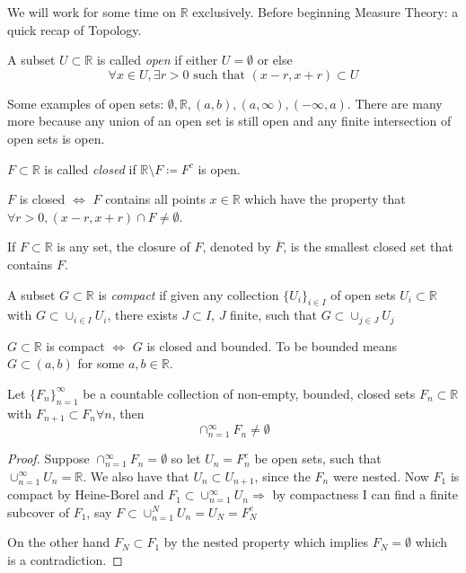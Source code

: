 We will work for some time on $\mathbb{R}$ exclusively.
Before beginning Measure Theory: a quick recap of Topology.

\begin{definition}
    A subset $U \subset \mathbb{R}$ is called \emph{open} if either $U = \emptyset$ or else
    \[
        \forall x \in U, \exists r > 0 \text{ such that } (x-r,x+r) \subset U
    \]
\end{definition}

Some examples of open sets: $\emptyset, \mathbb{R}, (a,b), (a,\infty), (-\infty, a)$.
There are many more because any union of an open set is still open and any finite intersection of open sets is open.

\begin{definition}
    $F \subset \mathbb{R}$ is called \emph{closed} if $\mathbb{R} \setminus F \coloneqq F^c $ is open.

    $F$ is closed $\iff$ $F$ contains all points $x \in \mathbb{R}$ which have the property that $\forall r > 0, (x-r, x+r) \cap F \neq \emptyset$.
\end{definition}

If $F \subset \mathbb{R}$ is any set, the closure of $F$, denoted by $\overline{F}$, is the smallest closed set that contains $F$.

\begin{definition}[Compact]
    A subset $G \subset \mathbb{R}$ is \emph{compact} if given any collection $\{ U_i \}_{i \in I}$ of open sets $U_i \subset \mathbb{R}$ with $G \subset \cup_{i \in I} U_i$, there exists $J \subset I$, $J$ finite, such that $G \subset \cup_{j \in J} U_j$
\end{definition}

\begin{theorem}
    $G \subset \mathbb{R}$ is compact $\iff$ $G$ is closed and bounded.
    To be bounded means $G \subset (a,b)$ for some $a,b \in \mathbb{R}$.
\end{theorem}

\begin{corollary}
    Let $\{ F_n \}_{n=1}^{\infty}$ be a countable collection of non-empty, bounded, closed sets $F_n \subset \mathbb{R}$ with $F_{n+1} \subset F_n \forall n$, then
    \[
        \cap_{n=1}^{\infty} F_n \neq \emptyset
    \]
\end{corollary}

\begin{proof}
    Suppose $\cap_{n=1}^{\infty} F_n = \emptyset$ so let $U_n = F_{n}^{c}$ be open sets, such that $\cup_{n=1}^{\infty} U_n = \mathbb{R}$.
    We also have that $U_n \subset U_{n+1}$, since the $F_n$ were nested.
    Now $F_1$ is compact by Heine-Borel and $F_1 \subset \cup_{n=1}^{\infty} U_n \Rightarrow $ by compactness
    I can find a finite subcover of $F_1$, say $F \subset \cup_{n=1}^{N} U_n = U_N = F_N ^{c}$

    On the other hand $F_N \subset F_1$ by the nested property which implies $F_N = \emptyset$ which is a contradiction.
\end{proof}